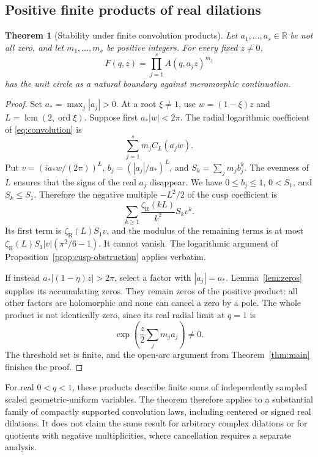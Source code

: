 \documentclass[11pt,a4paper]{article}
\numberwithin{equation}{section}
\newtheorem{theorem}{Theorem}[section]
\theoremstyle{definition}
\theoremstyle{remark}
\newcommand{\R}{\mathbb R}
\newcommand{\lcm}{\operatorname{lcm}}
\newcommand{\ord}{\operatorname{ord}}
\newcommand{\zR}{\zeta_{\mathrm R}}
\begin{document}
\subsection{Positive finite products of real dilations}
\begin{theorem}[Stability under finite convolution products]\label{thm:convolution}
Let \(a_1,\ldots,a_s\in\R\) be not all zero, and let \(m_1,\ldots,m_s\) be positive integers. For every fixed \(z\ne0\),
\begin{equation}\label{eq:convolution}
 F(q,z)=\prod_{j=1}^s A(q,a_jz)^{m_j}
\end{equation}
has the unit circle as a natural boundary against meromorphic continuation.
\end{theorem}
\begin{proof}
Set \(a_* =\max_j|a_j|>0\). At a root \(\xi\ne1\), use \(w=(1-\xi)z\) and \(L=\lcm(2,\ord\xi)\). Suppose first \(a_*|w|<2\pi\). The radial logarithmic coefficient of \eqref{eq:convolution} is
\[
 \sum_{j=1}^s m_j C_L(a_jw).
\]
Put \(v=(ia_*w/(2\pi))^L\), \(b_j=(|a_j|/a_*)^L\), and \(S_k=\sum_jm_jb_j^k\). The evenness of \(L\) ensures that the signs of the real \(a_j\) disappear. We have \(0\le b_j\le1\), \(0<S_1\), and \(S_k\le S_1\). Therefore the negative multiple \(-L^2/2\) of the cusp coefficient is
\[
 \sum_{k\ge1}\frac{\zR(kL)}{k^2}S_kv^k.
\]
Its first term is \(\zR(L)S_1v\), and the modulus of the remaining terms is at most
\(\zR(L)S_1|v|(\pi^2/6-1)\). It cannot vanish. The logarithmic argument of Proposition~\ref{prop:cusp-obstruction} applies verbatim.

If instead \(a_*|(1-\eta)z|>2\pi\), select a factor with \(|a_j|=a_*\). Lemma~\ref{lem:zeros} supplies its accumulating zeros. They remain zeros of the positive product: all other factors are holomorphic and none can cancel a zero by a pole. The whole product is not identically zero, since its real radial limit at \(q=1\) is
\[
 \exp\left(\frac z2\sum_jm_ja_j\right)\ne0.
\]
The threshold set is finite, and the open-arc argument from Theorem~\ref{thm:main} finishes the proof.
\end{proof}

For real \(0<q<1\), these products describe finite sums of independently sampled scaled geometric-uniform variables. The theorem therefore applies to a substantial family of compactly supported convolution laws, including centered or signed real dilations. It does not claim the same result for arbitrary complex dilations or for quotients with negative multiplicities, where cancellation requires a separate analysis.
\end{document}
